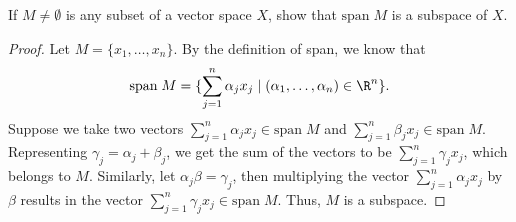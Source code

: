 \begin{question}
    If $M \neq \emptyset$ is any subset of a vector space $X$, show that $\textrm{span} \; M$ is a subspace of $X$.
    \label{section2.1-11}
\end{question}
\begin{proof}
    Let $M = \{x_1 , \ldots , x_n\}$. By the definition of span, we know that
    \[\textrm{span}\; M = \{\sum_{j=1}^n \alpha_j x_j \mid (\alpha_1 , \ldots , \alpha_n) \in \R^n\}.\]
    Suppose we take two vectors $\sum_{j=1}^n \alpha_j x_j \in \textrm{span}\; M$ and $\sum_{j=1}^n \beta_j x_j \in \textrm{span}\; M$. Representing $\gamma_j = \alpha_j + \beta_j$, we get the sum of the vectors to be $\sum_{j=1}^n \gamma_j x_j$, which belongs to $M$. Similarly, let $\alpha_j \beta = \gamma_j$, then multiplying the vector $\sum_{j=1}^n \alpha_j x_j$ by $\beta$ results in the vector $\sum_{j=1}^n \gamma_j x_j \in \textrm{span}\; M$. Thus, $M$ is a subspace.
\end{proof}

